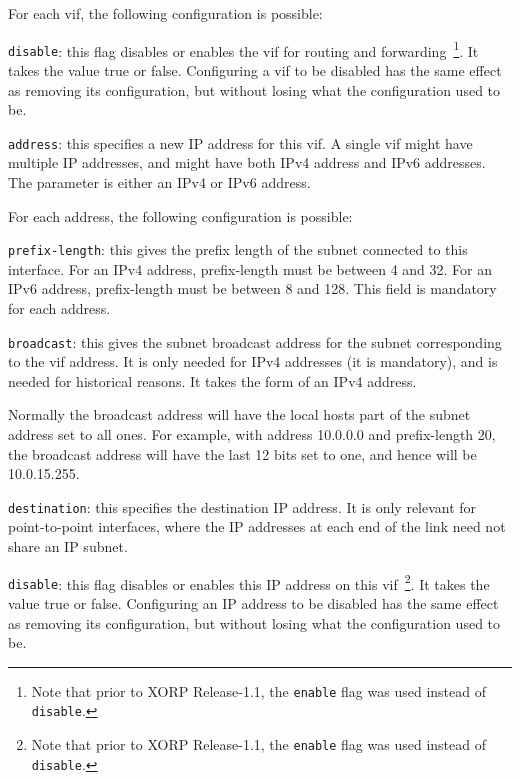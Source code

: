 \begin{description}
\begin{description}
  For each vif, the following configuration is possible:
\begin{description}
\item{\tt disable}: this flag disables or enables the vif for
  routing and forwarding~\footnote{Note
  that prior to XORP Release-1.1, the {\tt enable} flag was used instead of
  {\tt disable}.}.  It takes the value {\stt true} or {\stt
  false}.  Configuring a vif to be disabled has the same effect
  as removing its configuration, but without losing what the
  configuration used to be.
\item{\tt address}: this specifies a new IP address for this vif.  A
  single vif might have multiple IP addresses, and might have both IPv4
  address and IPv6 addresses.  The parameter is either an IPv4 or IPv6
  address.

  For each address, the following configuration is possible:
\begin{description}
\item{\tt prefix-length}: this gives the prefix length of the subnet
  connected to this interface.  For an IPv4 address, prefix-length
  must be between 4 and 32.  For an IPv6 address, prefix-length must
  be between 8 and 128.  This field is mandatory for each address.
\item{\tt broadcast}: this gives the subnet broadcast address for the
  subnet corresponding to the vif address.  It is only needed for IPv4
  addresses (it is mandatory), and is needed for historical reasons.
  It takes the form of an IPv4 address.

  Normally the broadcast address will have the local hosts part of the
  subnet address set to all ones.  For example, with address 10.0.0.0
  and prefix-length 20, the broadcast address will have the last 12
  bits set to one, and hence will be 10.0.15.255.
\item{\tt destination}: this specifies the destination IP address.  It
  is only relevant for point-to-point interfaces, where the IP addresses
  at each end of the link need not share an IP subnet.
\item{\tt disable}: this flag disables or enables this IP address on
  this vif~\footnote{Note
  that prior to XORP Release-1.1, the {\tt enable} flag was used instead of
  {\tt disable}.}.
  It takes the value {\stt true} or {\stt false}.
  Configuring an IP address to be disabled has the same effect as removing its
  configuration, but without losing what the configuration used to be.
\end{description}
\end{description}
\end{description}
\end{description}

